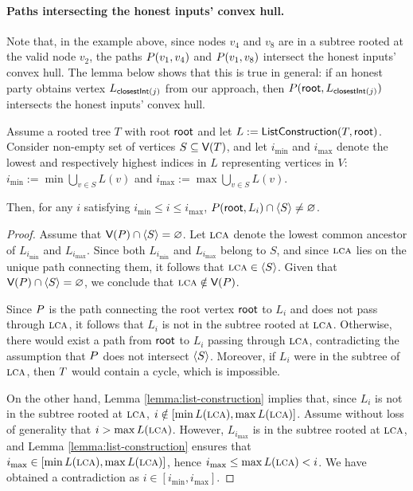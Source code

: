\paragraph{Paths intersecting the honest inputs' convex hull.} Note that, in the example above, since nodes $v_4$ and $v_8$ are in a subtree rooted at the valid node $v_2$, the paths $P(v_1, v_4)$ and $P(v_1, v_8)$ intersect the honest inputs' convex hull.
The lemma below shows that this is true in general: if an honest party obtains vertex $L_{\textsf{closestInt}(j)}$ from our approach, then $P(\textsf{root}, L_{\textsf{closestInt}(j)})$ intersects the honest inputs' convex hull.
\begin{lemma} \label{lemma:path-crosses-convex-hull}
    Assume a rooted tree $T$ with root $\textsf{root}$ and let $L := \textsf{ListConstruction}(T, \textsf{root})$.
    Consider non-empty set of vertices $S \subseteq \textsf{V}(T)$, and let $i_{\min}$ and $i_{\max}$ denote the lowest and respectively highest indices in $L$ representing vertices in $V$: $i_{\min} := \min \bigcup_{v \in S} L(v)$ and $i_{\max} := \max \bigcup_{v \in S} L(v)$. 
    
    Then, for any $i$ satisfying $i_{\min} \leq i \leq i_{\max}$, $P(\textsf{root}, L_i) \cap \langle{S}\rangle \neq \varnothing$.
\end{lemma}
\begin{proof}
    Assume that $\textsf{V}(P) \cap \langle{S}\rangle = \varnothing$.
    Let $\textsc{lca}$ denote the lowest common ancestor of $L_{i_{\min}}$ and $L_{i_{\max}}$. Since both $L_{i_{\min}}$ and $L_{i_{\max}}$ belong to $S$, and since $\textsc{lca}$ lies on the unique path connecting them, it follows that $\textsc{lca} \in \langle{S}\rangle$. Given that $\textsf{V}(P) \cap \langle{S}\rangle = \varnothing$, we conclude that $\textsc{lca} \notin \textsf{V}(P)$.  
    
    Since $P$ is the path connecting the root vertex $\textsf{root}$ to $L_i$ and does not pass through $\textsc{lca}$, it follows that $L_i$ is not in the subtree rooted at $\textsc{lca}$. Otherwise, there would exist a path from $\textsf{root}$ to $L_i$ passing through $\textsc{lca}$, contradicting the assumption that $P$ does not intersect $\langle{S}\rangle$. Moreover, if $L_i$ were in the subtree of $\textsc{lca}$, then $T$ would contain a cycle, which is impossible.  


    On the other hand, Lemma \ref{lemma:list-construction} implies that, since $L_i$ is not in the subtree rooted at $\textsc{lca}$, $i \notin [\min L(\textsc{lca}), \max L(\textsc{lca})]$. Assume without loss of generality that $i > \max L(\textsc{lca})$. However, $L_{i_{\max}}$ is in the subtree rooted at $\textsc{lca}$, and Lemma \ref{lemma:list-construction} ensures that $i_{\max} \in[\min L(\textsc{lca}), \max L(\textsc{lca})]$, hence $i_{\max} \leq \max L(\textsc{lca}) < i$.  We have obtained a contradiction as $i \in [i_{\min}, i_{\max}]$.
\end{proof}

